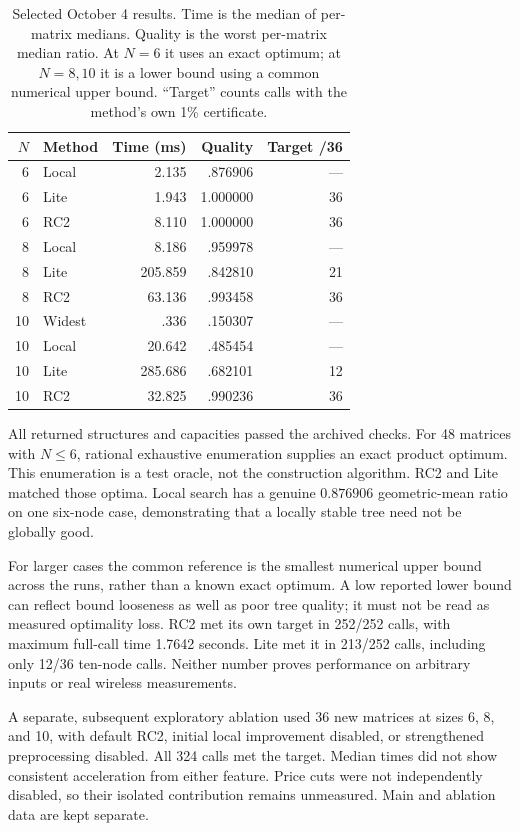 \documentclass[conference,letterpaper]{IEEEtran}
\begin{document}
\begin{table}[t]
\centering\small
\caption{Selected October 4 results. Time is the median of per-matrix medians. Quality is the worst per-matrix median ratio. At $N=6$ it uses an exact optimum; at $N=8,10$ it is a lower bound using a common numerical upper bound. ``Target'' counts calls with the method's own 1\% certificate.}
\label{tab:results}
\begin{tabular}{rlrrr}
\toprule
$N$ & Method & Time (ms) & Quality & Target /36\\\midrule
6 & Local & 2.135 & .876906 & ---\\
6 & Lite & 1.943 & 1.000000 & 36\\
6 & RC2 & 8.110 & 1.000000 & 36\\
8 & Local & 8.186 & .959978 & ---\\
8 & Lite & 205.859 & .842810 & 21\\
8 & RC2 & 63.136 & .993458 & 36\\
10 & Widest & .336 & .150307 & ---\\
10 & Local & 20.642 & .485454 & ---\\
10 & Lite & 285.686 & .682101 & 12\\
10 & RC2 & 32.825 & .990236 & 36\\\bottomrule
\end{tabular}
\end{table}

All returned structures and capacities passed the archived checks. For 48 matrices with $N\le6$, rational exhaustive enumeration supplies an exact product optimum. This enumeration is a test oracle, not the construction algorithm. RC2 and Lite matched those optima. Local search has a genuine $0.876906$ geometric-mean ratio on one six-node case, demonstrating that a locally stable tree need not be globally good.

For larger cases the common reference is the smallest numerical upper bound across the runs, rather than a known exact optimum. A low reported lower bound can reflect bound looseness as well as poor tree quality; it must not be read as measured optimality loss. RC2 met its own target in 252/252 calls, with maximum full-call time 1.7642 seconds. Lite met it in 213/252 calls, including only 12/36 ten-node calls. Neither number proves performance on arbitrary inputs or real wireless measurements.

A separate, subsequent exploratory ablation used 36 new matrices at sizes 6, 8, and 10, with default RC2, initial local improvement disabled, or strengthened preprocessing disabled. All 324 calls met the target. Median times did not show consistent acceleration from either feature. Price cuts were not independently disabled, so their isolated contribution remains unmeasured. Main and ablation data are kept separate.
\end{document}
